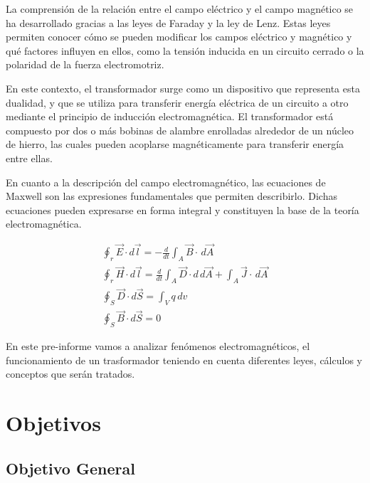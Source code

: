 \documentclass[twocolumn, 12pt]{article}
\begin{document}
La comprensión de la relación entre el campo eléctrico y el
campo magnético se ha desarrollado gracias a las leyes de
Faraday y la ley de Lenz. Estas leyes permiten conocer cómo
se pueden modificar los campos eléctrico y magnético y qué
factores influyen en ellos, como la tensión inducida en un
circuito cerrado o la polaridad de la fuerza electromotriz.

En este contexto, el transformador surge como un
dispositivo que representa esta dualidad, y que se utiliza
para transferir energía eléctrica de un circuito a otro
mediante el principio de inducción electromagnética. El
transformador está compuesto por dos o más bobinas de
alambre enrolladas alrededor de un núcleo de hierro, las
cuales pueden acoplarse magnéticamente para transferir
energía entre ellas.

En cuanto a la descripción del campo electromagnético, las
ecuaciones de Maxwell son las expresiones fundamentales que
permiten describirlo. Dichas ecuaciones pueden expresarse
en forma integral y constituyen la base de la teoría
electromagnética.

{\normalsize
\begin{equation}
	\begin{gathered}
		\oint_r \vec{E} \cdot d \vec{l} = - \frac{d}{dt} \int_{A}^{} \vec{B} \cdot \,d\vec{A} \\
		\oint_r \vec{H} \cdot d \vec{l} = \frac{d}{dt} \int_{A}^{} \vec{D} \cdot d \,d\vec{A} + \int_{A}^{} \vec{J} \cdot \,d\vec{A} \\
		\oint_S \vec{D} \cdot d \vec{S} = \int_{V}^{} q \,d{v} \\
		\oint_S \vec{B} \cdot d \vec{S} = 0
	\end{gathered}
\end{equation}
}

En este pre-informe vamos a analizar fenómenos
electromagnéticos, el funcionamiento de un trasformador
teniendo en cuenta diferentes leyes, cálculos y conceptos
que serán tratados.

\section{Objetivos}

\subsection*{Objetivo General}
\end{document}

